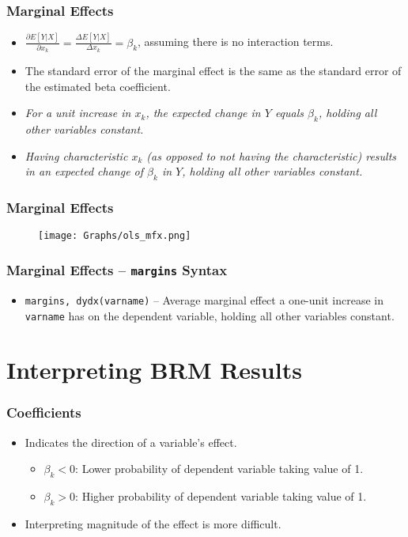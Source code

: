 \documentclass{beamer}
\begin{document}
\begin{frame}
	\frametitle{Marginal Effects}
	\begin{itemize}
		\item $\frac{\partial E[Y|X]}{\partial x_{k}}=\frac{\Delta E[Y|X]}{\Delta x_{k}}=\beta_{k}$, assuming there is no interaction terms.
		\item The standard error of the marginal effect is the same as the standard error of the estimated beta coefficient.
		\item \textit{For a unit increase in $x_{k}$, the expected change in $Y$ equals $\beta_{k}$, holding all other variables constant.}
		\item \textit{Having characteristic $x_{k}$ (as opposed to not having the characteristic) results in an expected change of $\beta_{k}$ in $Y$, holding all other variables constant.}
	\end{itemize}
\end{frame}

\begin{frame}
	\frametitle{Marginal Effects}
	\begin{figure}[p]
		\centering
		\texttt{[image: Graphs/ols\_mfx.png]}
		\label{fig:fig1}
	\end{figure}
\end{frame}

\begin{frame}
	\frametitle{Marginal Effects -- \texttt{margins} Syntax}
	\begin{itemize}
		\item \texttt{margins, dydx(varname)} -- Average marginal effect a one-unit increase in \texttt{varname} has on the dependent variable, holding all other variables constant.
	\end{itemize}
\end{frame}

\section{Interpreting BRM Results}

\begin{frame}
	\frametitle{Coefficients}
	\begin{itemize}
		\item Indicates the direction of a variable's effect.
		\begin{itemize}
			\item $\beta_{k}<0$: Lower probability of dependent variable taking value of 1.
			\item $\beta_{k}>0$: Higher probability of dependent variable taking value of 1.
		\end{itemize}
		\item Interpreting magnitude of the effect is more difficult.
	\end{itemize}
\end{frame}
\end{document}

